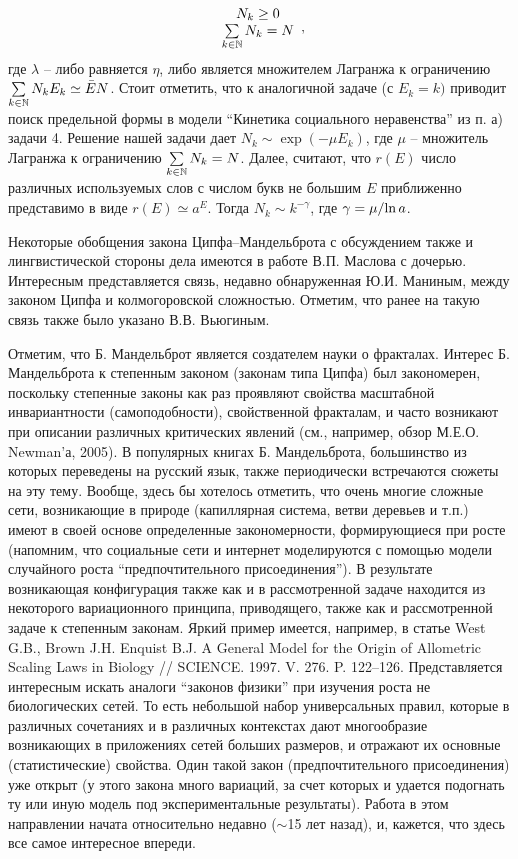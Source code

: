 \begin{remark}
\[{{\begin{array}{c}
 N_k \ge 0 \\ 
 \sum\limits_{k\in  \mathbb{N}} {N_k =N} \\ 
 \end{array}}} ,
\]
где $\lambda $ -- либо равняется $\eta $, либо является множителем Лагранжа 
к ограничению $\sum\limits_{k\in \mathbb{N}} {N_k E_k } \simeq \bar {E}N$. 
Стоит отметить, что к аналогичной задаче (с $E_k =k)$ приводит поиск 
предельной формы в модели ``Кинетика социального неравенства'' из п. а) 
задачи 4. Решение нашей задачи дает $N_k \sim \exp \left( {-\mu E_k } 
\right)$, где $\mu $ -- множитель Лагранжа к ограничению $\sum\limits_{k\in 
\mathbb{N}} {N_k } =N$. Далее, считают, что $r\left( E \right)$ число различных 
используемых слов с числом букв не большим $E$ приближенно представимо в 
виде $r\left( E \right)\simeq a^E$. Тогда $N_k \sim k^{-\gamma }$, где 
$\gamma =\mu \mathord{\left/ {\vphantom {\mu {\ln a}}} \right. 
\kern-\nulldelimiterspace} {\ln a}$. 

Некоторые обобщения закона Ципфа--Мандельброта с обсуждением также и 
лингвистической стороны дела имеются в работе В.П. Маслова с дочерью. 
Интересным представляется связь, недавно обнаруженная Ю.И. Маниным, между 
законом Ципфа и колмогоровской сложностью. Отметим, что ранее на такую связь 
также было указано В.В. Вьюгиным.

Отметим, что Б. Мандельброт является создателем науки о фракталах. 
Интерес Б. Мандельброта к степенным законом (законам типа Ципфа) был 
закономерен, поскольку степенные законы как раз проявляют свойства 
масштабной инвариантности (самоподобности), свойственной фракталам, и часто 
возникают при описании различных критических явлений (см., например, обзор 
М.Е.О. Newman'а, 2005). В популярных книгах Б. Мандельброта, большинство из 
которых переведены на русский язык, также периодически встречаются сюжеты на 
эту тему. Вообще, здесь бы хотелось отметить, что очень многие сложные сети, 
возникающие в природе (капиллярная система, ветви деревьев и т.п.) имеют в 
своей основе определенные закономерности, формирующиеся при росте (напомним, 
что социальные сети и интернет моделируются с помощью модели случайного 
роста ``предпочтительного присоединения''). В результате возникающая 
конфигурация также как и в рассмотренной задаче находится из некоторого 
вариационного принципа, приводящего, также как и рассмотренной задаче к 
степенным законам. Яркий пример имеется, например, в статье West G.B., Brown J.H. Enquist B.J. A General Model 
for the Origin of Allometric Scaling Laws in Biology // SCIENCE. 1997. V. 
276. P. 122--126. Представляется интересным искать аналоги ``законов 
физики'' при изучения роста не биологических сетей. То есть небольшой набор 
универсальных правил, которые в различных сочетаниях и в различных 
контекстах дают многообразие возникающих в приложениях сетей больших 
размеров, и отражают их основные (статистические) свойства. Один такой закон 
(предпочтительного присоединения) уже открыт (у этого закона много вариаций, 
за счет которых и удается подогнать ту или иную модель под экспериментальные 
результаты). Работа в этом направлении начата относительно недавно ($\sim 
$15 лет назад), и, кажется, что здесь все самое интересное впереди. 
\end{remark}

